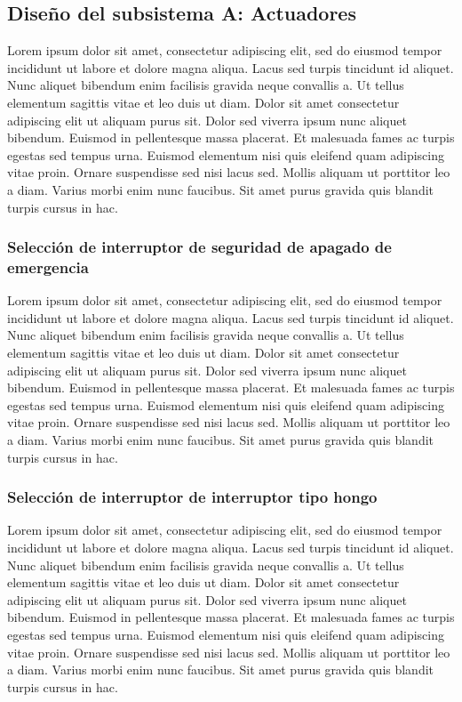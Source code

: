 \subsection{Diseño del subsistema A: Actuadores}

Lorem ipsum dolor sit amet, consectetur adipiscing elit, sed do eiusmod tempor incididunt ut labore et dolore magna aliqua. Lacus sed turpis tincidunt id aliquet. Nunc aliquet bibendum enim facilisis gravida neque convallis a. Ut tellus elementum sagittis vitae et leo duis ut diam. Dolor sit amet consectetur adipiscing elit ut aliquam purus sit. Dolor sed viverra ipsum nunc aliquet bibendum. Euismod in pellentesque massa placerat. Et malesuada fames ac turpis egestas sed tempus urna. Euismod elementum nisi quis eleifend quam adipiscing vitae proin. Ornare suspendisse sed nisi lacus sed. Mollis aliquam ut porttitor leo a diam. Varius morbi enim nunc faucibus. Sit amet purus gravida quis blandit turpis cursus in hac.

\subsubsection{Selección de interruptor de seguridad de apagado de emergencia}

Lorem ipsum dolor sit amet, consectetur adipiscing elit, sed do eiusmod tempor incididunt ut labore et dolore magna aliqua. Lacus sed turpis tincidunt id aliquet. Nunc aliquet bibendum enim facilisis gravida neque convallis a. Ut tellus elementum sagittis vitae et leo duis ut diam. Dolor sit amet consectetur adipiscing elit ut aliquam purus sit. Dolor sed viverra ipsum nunc aliquet bibendum. Euismod in pellentesque massa placerat. Et malesuada fames ac turpis egestas sed tempus urna. Euismod elementum nisi quis eleifend quam adipiscing vitae proin. Ornare suspendisse sed nisi lacus sed. Mollis aliquam ut porttitor leo a diam. Varius morbi enim nunc faucibus. Sit amet purus gravida quis blandit turpis cursus in hac.

\subsubsection{Selección de interruptor de interruptor tipo hongo}

Lorem ipsum dolor sit amet, consectetur adipiscing elit, sed do eiusmod tempor incididunt ut labore et dolore magna aliqua. Lacus sed turpis tincidunt id aliquet. Nunc aliquet bibendum enim facilisis gravida neque convallis a. Ut tellus elementum sagittis vitae et leo duis ut diam. Dolor sit amet consectetur adipiscing elit ut aliquam purus sit. Dolor sed viverra ipsum nunc aliquet bibendum. Euismod in pellentesque massa placerat. Et malesuada fames ac turpis egestas sed tempus urna. Euismod elementum nisi quis eleifend quam adipiscing vitae proin. Ornare suspendisse sed nisi lacus sed. Mollis aliquam ut porttitor leo a diam. Varius morbi enim nunc faucibus. Sit amet purus gravida quis blandit turpis cursus in hac.

